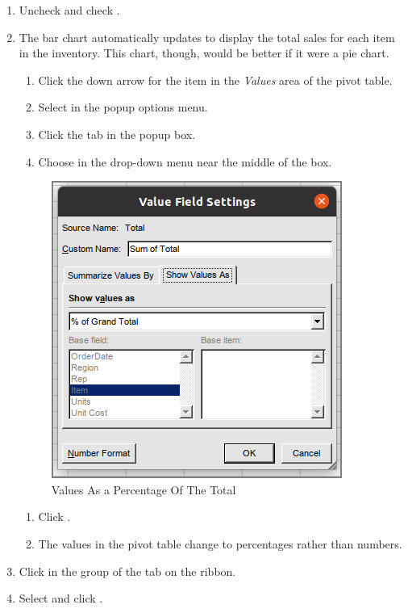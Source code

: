 \begin{enumerate}
	\item Uncheck  and check .
	\item The bar chart automatically updates to display the total sales for each item in the inventory. This chart, though, would be better if it were a pie chart.
	
	\begin{enumerate}
		\item Click the down arrow for the  item in the \textit{Values} area of the pivot table.
		\item Select  in the popup options menu.
		\item Click the  tab in the  popup box.
		\item Choose  in the drop-down menu near the middle of the  box.
\end{enumerate}

\begin{figure}[H]
	\centering
	\includegraphics[width=\maxwidth{.95\linewidth}]{gfx/ch07_fig29}
	\caption{Values As a Percentage Of The Total}
	\label{07:fig29}
\end{figure}

\begin{enumerate}[resume]		
		\item Click .
		\item The values in the pivot table change to percentages rather than numbers.
	\end{enumerate}
	
	\item Click  in the  group of the  tab on the ribbon.
	\item Select  and click .
\end{enumerate}

